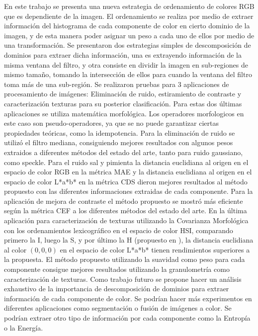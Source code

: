 En este trabajo se presenta una nueva estrategia de ordenamiento de colores RGB que es dependiente de la imagen. El ordenamiento se realiza por medio de extraer información del histograma de cada componente de color en cierto dominio de la imagen, y de esta manera poder asignar un peso a cada uno de ellos por medio de una transformación. Se presentaron dos estrategias simples de descomposición de dominios para extraer dicha información, una es extrayendo información de la misma ventana del filtro, y otra consiste en dividir la imagen en sub-regiones de mismo tamaño, tomando la intersección de ellos para cuando la ventana del filtro toma más de una sub-región.
Se realizaron pruebas para 3 aplicaciones de procesamiento de imágenes: Eliminación de ruido, estiramiento de contraste y caracterización texturas para su posterior clasificación.  Para estas dos últimas aplicaciones se utiliza matemática morfológica. Los operadores morfologicos en este caso son pseudo-operadores, ya que se no puede garantizar ciertas propiedades teóricas, como la idempotencia. 
Para la eliminación de ruido se utilizó el filtro mediana, consiguiendo mejores resultados con algunos pesos extraidos a diferentes métodos del estado del arte, tanto para ruido gaussiano, como speckle. Para el ruido sal y pimienta la distancia euclidiana al origen en el espacio de color RGB en la métrica MAE y la distancia euclidiana al origen en el espacio de color L*a*b* en la métrica CDS dieron mejores resultados al método propuesto con las diferentes informaciones extraidas de cada componente. 
Para la aplicación de mejora de contraste el método propuesto se mostró más eficiente según la métrica CEF a los diferentes métodos del estado del arte. En la última aplicación para caracterización de texturas utilizando la Covarianza Morfológica con los ordenamientos lexicográfico en el espacio de color HSI, comparando primero la I, luego la S, y por último la H (propuesto en \cite{ortiz2004gaussian}), la distancia euclidiana al color $(0,0,0)$ en el espacio de color L*a*b* \cite{ortiz2002procesamiento}  tienen rendimientos superiores a la propuesta. El método propuesto utilizando la suavidad como peso para cada componente  consigue mejores resultados  utilizando la granulometría como caracterización de texturas.
Como trabajo futuro se propone hacer un análisis exhaustivo de la importancia de descomposición de dominios para extraer información de cada componente de color. Se podrían hacer más experimentos en diferentes aplicaciones como segmentación o fusión de imágenes a color. Se podrían extraer otro tipo de información por cada componente como la Entropía o la Energía.
 


